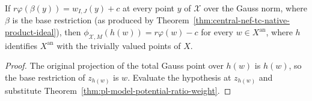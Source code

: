 \begin{corollary}
\label{cor:pl-model-potential-convex-function}
\leanok
If $r\varphi(\beta(y))=w_{I,J}(y)+c$ at every point $y$ of $\mathcal X$ over
the Gauss norm, where $\beta$ is the base restriction (as produced by
Theorem~\ref{thm:central-nef-tc-native-product-ideal}), then
$\phi_{\mathcal X,M}(h(w))=r\varphi(w)-c$ for every $w\in X^{\mathrm{an}}$,
where $h$ identifies $X^{\mathrm{an}}$ with the trivially valued points of $X$.
\end{corollary}
\begin{proof}
The original projection of the total Gauss point over $h(w)$ is $h(w)$, so
the base restriction of $z_{h(w)}$ is $w$.  Evaluate the hypothesis at
$z_{h(w)}$ and substitute Theorem~\ref{thm:pl-model-potential-ratio-weight}.
\end{proof}
